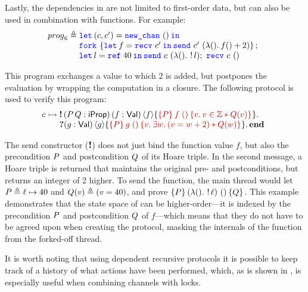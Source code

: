 Lastly, the dependencies in \pname are not limited to first-order data, but can also be used
in combination with functions.
For example:
\[
{\mathit prog}_6\eqdef
\begin{array}[t]{@{} l}
  \Let {(\chan,\chan')} = \newchan in \\
  \Fork{\Let{f} = \recv{\chan'} in \send {\chan'} {(\Lam \TT. f\TT+2)}}; \\
  \Let l = \newref{40} in \send{\chan}{(\Lam \TT. \deref l)};\ \recv {\chan}\ \TT
\end{array}
\]

\noindent
This program exchanges a value to which $2$ is added,
but postpones the evaluation by wrapping the computation in a closure.
The following protocol is used to verify this program:
\begin{align*}
\interp{\chan}{
  \begin{array}[t]{@{} l}
  \sendprot{(\iprop\,\ipropB : \iProp)\,(f:\Val)}{f}
    {\textcolor{darkred}{\hoare \iprop {f\;\TT} {\Ret \val.\val \in \integer * \ipropB(\val)}}}
  \\
  \recvprot{(g:\Val)}{g}
    {\textcolor{darkred}{\hoare \iprop {g\;\TT} {\Ret \val. \Exists \valB. (\val = \valB + 2) * \ipropB(\valB)}}}
    \protend
  \end{array}}
\end{align*}

\noindent
The send constructor ($\textnormal{\bf !}$) does not just bind the function value
$f$, but also the precondition $P$ and postcondition $Q$ of its
Hoare triple.
In the second message, a Hoare triple is returned that maintains the original
pre- and postconditions, but returns an integer of 2 higher.
To send the function, the main thread would let $P \triangleq \ell \mapsto 40$ and $Q(v) \triangleq (v = 40)$, and prove
$\hoare { \iprop } {(\Lam \TT. \deref \loc)\ \TT} { \ipropB }$.
This example demonstrates that the state space of \pname can be
higher-order---it is indexed by the precondition $P$ and postcondition
$Q$ of $f$---which means that they do not have to be agreed upon
when creating the protocol, masking the internals of the function from the forked-off thread.

It is worth noting that using dependent recursive protocols it is possible to
keep track of a history of what actions have been performed, which, as is shown in
,
is especially useful when combining channels with locks.

